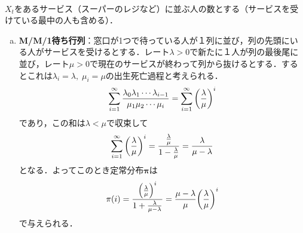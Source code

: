 \documentclass[dvipdfmx]{jsarticle}
\numberwithin{equation}{section}
\theoremstyle{definition}
\newcommand{\bpi}{\bm{\pi}}
\newcommand{\0}{\bm{0}}
\newcommand{\1}{\bm{1}}
\begin{document}
\paragraph{} $X_t$をあるサービス（スーパーのレジなど）に並ぶ人の数とする（サービスを受けている最中の人も含める）．
\begin{enumerate}[(a)]
  \item {\bf M/M/1待ち行列}：窓口が1つで待っている人が１列に並び，列の先頭にいる人がサービスを受けるとする．レート$\lambda > 0$で新たに１人が列の最後尾に並び，レート$\mu > 0$で現在のサービスが終わって列から抜けるとする．するとこれは$\lambda_i = \lambda, \; \mu_i = \mu$の出生死亡過程と考えられる．
  \begin{align}
    \sum_{i=1}^{\infty} \frac{\lambda_0 \lambda_1 \cdots \lambda_{i-1}}{\mu_1 \mu_2 \cdots \mu_i}
    = \sum_{i=1}^{\infty} \qty( \frac{\lambda}{\mu} )^i
  \end{align}
  であり，この和は$\lambda < \mu$で収束して
  \begin{align}
    \sum_{i=1}^{\infty} \qty( \frac{\lambda}{\mu} )^i 
    = \frac{\frac{\lambda}{\mu}}{1 - \frac{\lambda}{\mu}} 
    = \frac{\lambda}{\mu - \lambda}
  \end{align}
  となる．よってこのとき定常分布$\bpi$は
  \begin{align}
    \pi(i) = \frac{\qty( \frac{\lambda}{\mu} )^i}{1 + \frac{\lambda}{\mu - \lambda}}
    = \frac{\mu - \lambda}{\mu} \qty( \frac{\lambda}{\mu} )^i
  \end{align}
  で与えられる．
  

\end{enumerate}
\end{document}
